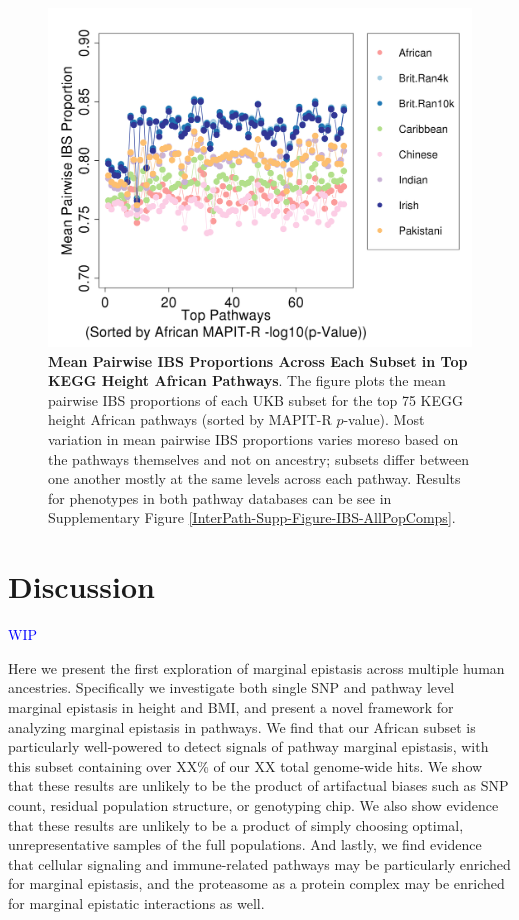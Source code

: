 \documentclass[12pt,a4paper]{article}
\begin{document}
\begin{figure}[htb]
\centering
\includegraphics[scale=.35]{Images/Main/InterPath_Main_Figure_IBS_AllPopComps_vs2_AfrHght.png}
\caption[TBD]{\textbf{Mean Pairwise IBS Proportions Across Each Subset in Top KEGG Height African Pathways}. The figure plots the mean pairwise IBS proportions of each UKB subset for the top 75 KEGG height African pathways (sorted by MAPIT-R $p$-value). Most variation in mean pairwise IBS proportions varies moreso based on the pathways themselves and not on ancestry; subsets differ between one another mostly at the same levels across each pathway. Results for phenotypes in both pathway databases can be see in Supplementary Figure \ref{InterPath-Supp-Figure-IBS-AllPopComps}.}
\label{InterPath-Main-Figure-IBS-AllPopComps-AfrHght}
\end{figure}

\section{Discussion}\label{InterPath-Discussion}

\textcolor{blue}{WIP}

Here we present the first exploration of marginal epistasis across multiple human ancestries. Specifically we investigate both single SNP and pathway level marginal epistasis in height and BMI, and present a novel framework for analyzing marginal epistasis in pathways. We find that our African subset is particularly well-powered to detect signals of pathway marginal epistasis, with this subset containing over XX\% of our XX total genome-wide hits. We show that these results are unlikely to be the product of artifactual biases such as SNP count, residual population structure, or genotyping chip. We also show evidence that these results are unlikely to be a product of simply choosing optimal, unrepresentative samples of the full populations. And lastly, we find evidence that cellular signaling and immune-related pathways may be particularly enriched for marginal epistasis, and the proteasome as a protein complex may be enriched for marginal epistatic interactions as well. 
\end{document}
